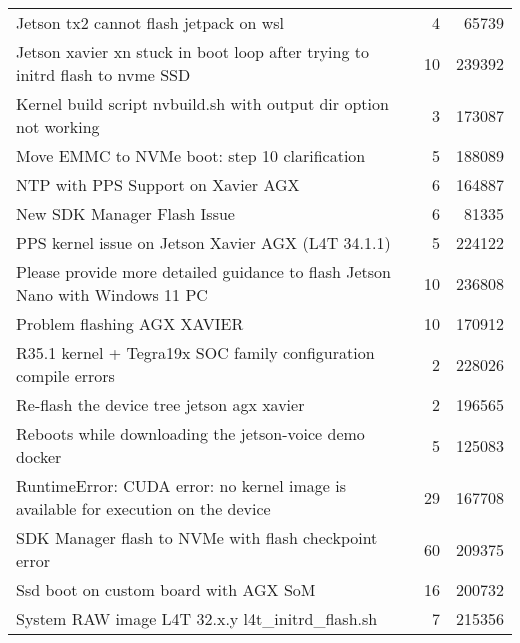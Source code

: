 \begin{longtable}{p{}rr}
    Jetson tx2 cannot flash jetpack on wsl                                                              & 4       & 65739  \\
    Jetson xavier xn stuck in boot loop after trying to initrd flash to nvme SSD                        & 10      & 239392 \\
    Kernel build script nvbuild.sh with output dir option not working                                   & 3       & 173087 \\
    Move EMMC to NVMe boot: step 10 clarification                                                       & 5       & 188089 \\
    NTP with PPS Support on Xavier AGX                                                                  & 6       & 164887 \\
    New SDK Manager Flash Issue                                                                         & 6       & 81335  \\
    PPS kernel issue on Jetson Xavier AGX (L4T 34.1.1)                                                  & 5       & 224122 \\
    Please provide more detailed guidance to flash Jetson Nano with Windows 11 PC                       & 10      & 236808 \\
    Problem flashing AGX XAVIER                                                                         & 10      & 170912 \\
    R35.1 kernel + Tegra19x SOC family configuration compile errors                                     & 2       & 228026 \\
    Re-flash the device tree jetson agx xavier                                                          & 2       & 196565 \\
    Reboots while downloading the jetson-voice demo docker                                              & 5       & 125083 \\
    RuntimeError: CUDA error: no kernel image is available for execution on the device                  & 29      & 167708 \\
    SDK Manager flash to NVMe with flash checkpoint error                                               & 60      & 209375 \\
    Ssd boot on custom board with AGX SoM                                                               & 16      & 200732 \\
    System RAW image L4T 32.x.y l4t\_initrd\_flash.sh                                                   & 7       & 215356 \\

\end{longtable}
